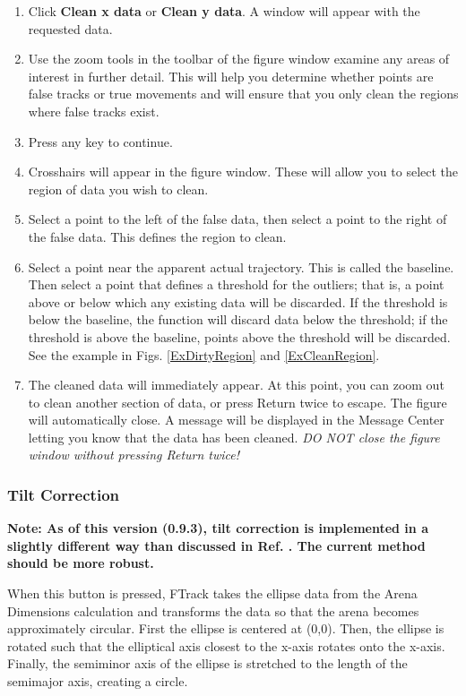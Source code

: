 \documentclass[letterpaper, 11pt]{article}
\begin{document}
\begin{enumerate}
\item Click \textbf{Clean x data} or \textbf{Clean y data}.  A window will appear with the
requested data.
\item Use the zoom tools in the toolbar of the figure window examine any areas of interest in
further detail.  This will help you determine whether points are false tracks or true movements and
will ensure that you only clean the regions where false tracks exist.
\item Press any key to continue.
\item Crosshairs will appear in the figure window.  These will allow you to select the region of data you wish to clean.
\item Select a point to the left of the false data, then select a point to the right of the false
data. This defines the region to clean.
\item Select a point near the apparent actual trajectory.  This is called the baseline.  Then
select a point that defines a threshold for the outliers; that is, a point above or below which any
existing data will be discarded.  If the threshold is below the baseline, the function will discard
data below the threshold; if the threshold is above the baseline, points above the threshold will
be discarded. See the example in Figs. \ref{ExDirtyRegion} and \ref{ExCleanRegion}.
\item  The cleaned data will immediately appear.  At this point, you can zoom out to clean another
section of data, or press Return twice to escape.   The figure will automatically close. A message
will be displayed in the Message Center letting you know that the data has been cleaned.  \emph{DO
NOT close the figure window without pressing Return twice!}
\end{enumerate}


\subsubsection*{Tilt Correction}

\textbf{Note: As of this version (0.9.3), tilt correction is implemented in a slightly different
way than discussed in Ref. \cite{valente1}.  The current method should be more robust.}

When this button is pressed, FTrack takes the ellipse data from the Arena Dimensions calculation
and transforms the data so that the arena becomes approximately circular. First the ellipse is
centered at (0,0).  Then, the ellipse is rotated such that the elliptical axis closest to the
x-axis rotates onto the x-axis.  Finally, the semiminor axis of the ellipse is stretched to the
length of the semimajor axis, creating a circle.
\end{document}
